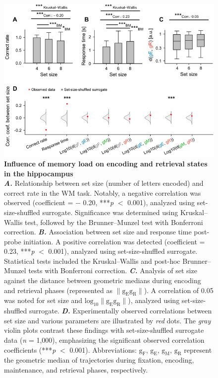 \documentclass[final,3p,times,twocolumn]{elsarticle}
\begin{document}
        \clearpage
        \begin{figure}[ht]
        	\centering
            \includegraphics[width=1\textwidth]{./media/figures/.png/Figure_ID_03.png}
        	\caption{\textbf{
Influence of memory load on encoding and retrieval states in the hippocampus
}
\smallskip
\\
\textbf{\textit{A.}} Relationship between set size (number of letters encoded) and correct rate in the WM task. Notably, a negative correlation was observed (coefficient = $-$ 0.20, ***\textit{p} $<$ 0.001), analyzed using set-size-shuffled surrogate. Significance was determined using Kruskal--Wallis test, followed by the Brunner--Munzel test with Bonferroni correction. \textbf{\textit{B.}}  Association between set size and response time post-probe initiation. A positive correlation was detected (coefficient = 0.23, ***\textit{p} $<$ 0.001), analyzed using set-size-shuffled surrogate. Statistical tests included the Kruskal--Wallis and post-hoc Brunner--Munzel tests with Bonferroni correction. \textbf{\textit{C.}}  Analysis of set size against the distance between geometric medians during encoding and retrieval phases (represented as $\lVert \mathrm{g_{E}g_{R}} \rVert$). A correlation of 0.05 was noted for set size and $\mathrm{log_{10}{\lVert g_{E}g_{R} \rVert}}$), analyzed using set-size-shuffled surrogate. \textbf{\textit{D.}}  Experimentally observed correlations between set size and various parameters are illustrated by \textit{red} dots. The \textit{gray} violin plots contrast these findings with set-size-shuffled surrogate data (\textit{n} = 1,000), emphasizing the significant observed correlation coefficients (***\textit{p} $<$ 0.001). Abbreviations: $\mathrm{g_{F}}$, $\mathrm{g_{E}}$, $\mathrm{g_{M}}$, $\mathrm{g_{R}}$ represent the geometric median of trajectories during fixation, encoding, maintenance, and retrieval phases, respectively.
}
        	\label{fig:03}
        \end{figure}
\end{document}

